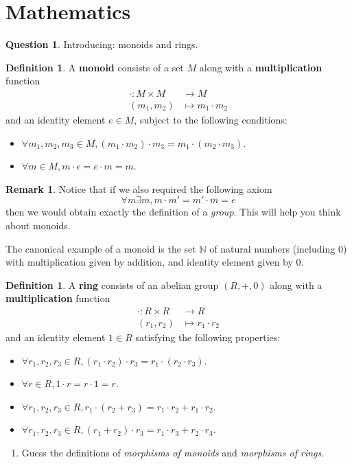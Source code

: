 \documentclass[12pt]{article}
\theoremstyle{plain}
\theoremstyle{definition}
\newtheorem{defn}[thm]{Definition} %
\newtheorem{remark}[thm]{Remark}
\newtheorem{question}[thm]{Question}
\newcommand{\bb}[1]{\mathbb{#1}}
\newcommand{\lto}{\longrightarrow}
\begin{document}
	\section{Mathematics}
	\begin{question}
		Introducing: monoids and rings.
		\begin{defn}
			A \textbf{monoid} consists of a set $M$ along with a \textbf{multiplication} function
			\begin{align*}
				\cdot: M \times M &\lto M\\
				(m_1, m_2) &\longmapsto m_1 \cdot m_2
			\end{align*}
			and an identity element $e \in M$, subject to the following conditions:
			\begin{itemize}
				\item $\forall m_1, m_2, m_3 \in M, (m_1 \cdot m_2) \cdot m_3 = m_1 \cdot (m_2 \cdot m_3)$.
				\item $\forall m \in M, m \cdot e = e \cdot m = m$.
			\end{itemize}
		\begin{remark}
			Notice that if we also required the following axiom
			\begin{equation}
				\forall m \exists m, m \cdot m' = m' \cdot m = e
			\end{equation}
			then we would obtain exactly the definition of a \emph{group}. This will help you think about monoids.
			
			The canonical example of a monoid is the set $\bb{N}$ of natural numbers (including $0$) with multiplication given by addition, and identity element given by $0$.
		\end{remark}
		\end{defn}
	\begin{defn}
		A \textbf{ring} consists of an abelian group $(R, +, 0)$ along with a \textbf{multiplication} function
		\begin{align*}
			\cdot: R \times R &\lto R\\
			(r_1, r_2) &\longmapsto r_1 \cdot r_2
		\end{align*}
		and an identity element $1 \in R$ satisfying the following properties:
		\begin{itemize}
			\item $\forall r_1, r_2, r_3 \in R, (r_1 \cdot r_2) \cdot r_3 = r_1 \cdot (r_2 \cdot r_3)$.
			\item $\forall r \in R, 1 \cdot r = r \cdot 1 = r$.
			\item $\forall r_1, r_2, r_3 \in R, r_1\cdot(r_2 + r_3) = r_1 \cdot r_2 + r_1 \cdot r_2$.
			\item $\forall r_1, r_2, r_3 \in R, (r_1 + r_2) \cdot r_3 = r_1 \cdot r_3 + r_2 \cdot r_3$.
		\end{itemize}
	\end{defn}
		\begin{enumerate}
			\item Guess the definitions of \emph{morphisms of monoids} and \emph{morphisms of rings}.
			

\end{enumerate}
\end{question}
\end{document}
